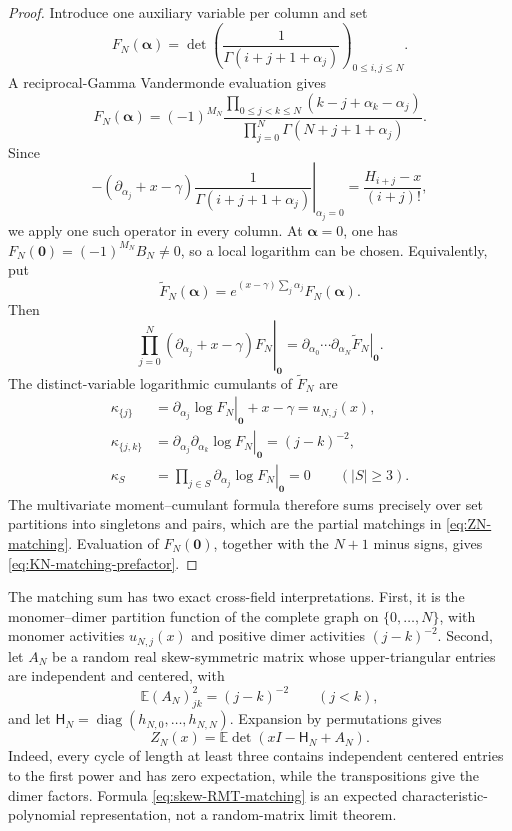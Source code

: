 \begin{proof}
Introduce one auxiliary variable per column and set
\[
 F_N(\boldsymbol\alpha)=
 \det\left(\frac1{\Gamma(i+j+1+\alpha_j)}\right)_{0\leq i,j\leq N}.
\]
A reciprocal-Gamma Vandermonde evaluation gives
\begin{equation}
 F_N(\boldsymbol\alpha)=(-1)^{M_N}
 \frac{\prod_{0\leq j<k\leq N}
 (k-j+\alpha_k-\alpha_j)}
 {\prod_{j=0}^N\Gamma(N+j+1+\alpha_j)}.
 \label{eq:reciprocal-gamma-Vandermonde}
\end{equation}
Since
\[
 -\left.(\partial_{\alpha_j}+x-\gamma)
 \frac1{\Gamma(i+j+1+\alpha_j)}\right|_{\alpha_j=0}
 =\frac{H_{i+j}-x}{(i+j)!},
\]
we apply one such operator in every column.  At
\(\boldsymbol\alpha=0\), one has
\(F_N(\boldsymbol0)=(-1)^{M_N}B_N\neq0\), so a local logarithm can be chosen.
Equivalently, put
\[
 \widetilde F_N(\boldsymbol\alpha)
 =e^{(x-\gamma)\sum_j\alpha_j}F_N(\boldsymbol\alpha).
\]
Then
\[
 \left.\prod_{j=0}^N(\partial_{\alpha_j}+x-\gamma)F_N
 \right|_{\boldsymbol0}
 =
 \left.\partial_{\alpha_0}\cdots\partial_{\alpha_N}\widetilde F_N
 \right|_{\boldsymbol0}.
\]
The distinct-variable logarithmic cumulants of \(\widetilde F_N\) are
\begin{align*}
 \kappa_{\{j\}}
 &=\left.\partial_{\alpha_j}\log F_N\right|_{\boldsymbol0}+x-\gamma
   =u_{N,j}(x),\\
 \kappa_{\{j,k\}}
 &=\left.\partial_{\alpha_j}\partial_{\alpha_k}\log F_N
   \right|_{\boldsymbol0}=(j-k)^{-2},\\
 \kappa_S
 &=\left.\prod_{j\in S}\partial_{\alpha_j}\log F_N
   \right|_{\boldsymbol0}=0\qquad(|S|\geq3).
\end{align*}
The multivariate moment--cumulant formula therefore sums precisely over set
partitions into singletons and pairs, which are the partial matchings in
\eqref{eq:ZN-matching}.  Evaluation of \(F_N(\boldsymbol0)\), together with
the \(N+1\) minus signs, gives
\eqref{eq:KN-matching-prefactor}.
\end{proof}

The matching sum has two exact cross-field interpretations.  First, it is the
monomer--dimer partition function of the complete graph on
\(\{0,\ldots,N\}\), with monomer activities \(u_{N,j}(x)\) and positive dimer
activities \((j-k)^{-2}\).  Second, let \(A_N\) be a random real
skew-symmetric matrix whose upper-triangular entries are independent and
centered, with
\[
 \mathbb E(A_N)_{jk}^2=(j-k)^{-2}\qquad(j<k),
\]
and let
\(\mathsf H_N=\operatorname{diag}(h_{N,0},\ldots,h_{N,N})\).  Expansion by
permutations gives
\begin{equation}
 \boxed{Z_N(x)=\mathbb E\det(xI-\mathsf H_N+A_N).}
 \label{eq:skew-RMT-matching}
\end{equation}
Indeed, every cycle of length at least three contains independent centered
entries to the first power and has zero expectation, while the transpositions
give the dimer factors.  Formula \eqref{eq:skew-RMT-matching} is an expected
characteristic-polynomial representation, not a random-matrix limit theorem.

